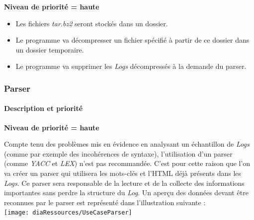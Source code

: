 \textbf{Niveau de priorité = haute}



\begin{itemize}
  \item Les fichiers \textit{tar.bz2} seront stockés dans un dossier.
  \item Le programme va  décompresser un fichier spécifié à partir de ce dossier dans un dossier temporaire.
  \item Le programme va  supprimer les \textit{Logs} décompressés  à la demande du parser.
\end{itemize}

\subsubsection{Parser}

\paragraph*{Description et priorité} 



\textbf{Niveau de priorité = haute}



Compte tenu des problèmes mis en évidence en analysant un échantillon de \textit{Logs} (comme par exemple des incohérences de syntaxe), l'utilisation d'un parser (comme \textit{YACC} et \textit{LEX}) n'est pas recommandée. C'est pour cette raison que l'on va créer un parser qui utilisera les mots-clés et l'HTML déjà présents dans les \textit{Logs}. Ce parser sera responsable de la lecture et de la collecte des informations importantes sans perdre la structure du \textit{Log}.
Un aperçu des données devant être reconnues par le parser est représenté dans l'illustration suivante :\\

\texttt{[image: diaRessources/UseCaseParser]}

